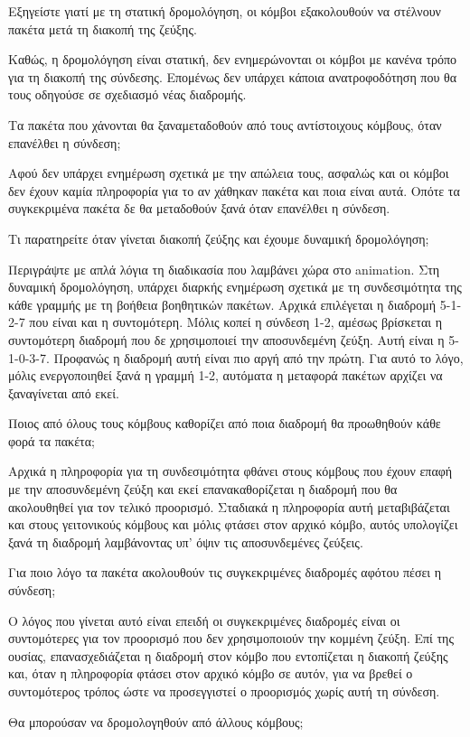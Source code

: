 \documentclass[a4paper,9pt]{article}
\begin{document}
\begin{itermize}
\item Εξηγείστε γιατί με τη στατική δρομολόγηση, οι κόμβοι εξακολουθούν να
στέλνουν πακέτα μετά τη διακοπή της ζεύξης.

Καθώς, η δρομολόγηση είναι στατική, δεν ενημερώνονται οι κόμβοι με κανένα
τρόπο για τη διακοπή της σύνδεσης. Επομένως δεν υπάρχει κάποια ανατροφοδότηση
που θα τους οδηγούσε σε σχεδιασμό νέας διαδρομής.

\item Τα πακέτα που χάνονται θα ξαναμεταδοθούν από τους αντίστοιχους κόμβους,
όταν επανέλθει η σύνδεση;

Αφού δεν υπάρχει ενημέρωση σχετικά με την απώλεια τους, ασφαλώς και οι κόμβοι
δεν έχουν καμία πληροφορία για το αν χάθηκαν πακέτα και ποια είναι αυτά. Οπότε
τα συγκεκριμένα πακέτα δε θα μεταδοθούν ξανά όταν επανέλθει η σύνδεση.

\item Τι παρατηρείτε όταν γίνεται διακοπή ζεύξης και έχουμε δυναμική
δρομολόγηση; 

Περιγράψτε με απλά λόγια τη διαδικασία που λαμβάνει χώρα στο animation.
Στη δυναμική δρομολόγηση, υπάρχει διαρκής ενημέρωση σχετικά με τη
συνδεσιμότητα της κάθε γραμμής με τη βοήθεια βοηθητικών πακέτων. Αρχικά
επιλέγεται η διαδρομή 5-1-2-7 που είναι και η συντομότερη. Μόλις κοπεί η
σύνδεση 1-2, αμέσως βρίσκεται η συντομότερη διαδρομή που δε χρησιμοποιεί την
αποσυνδεμένη ζεύξη. Αυτή είναι η 5-1-0-3-7. Προφανώς η διαδρομή αυτή είναι πιο
αργή από την πρώτη. Για αυτό το λόγο, μόλις ενεργοποιηθεί ξανά η γραμμή 1-2,
αυτόματα η μεταφορά πακέτων αρχίζει να ξαναγίνεται από εκεί.

\item Ποιος από όλους τους κόμβους καθορίζει από ποια διαδρομή θα προωθηθούν
κάθε φορά τα πακέτα;

Αρχικά η πληροφορία για τη συνδεσιμότητα φθάνει στους κόμβους που έχουν επαφή
με την αποσυνδεμένη ζεύξη και εκεί επανακαθορίζεται η διαδρομή που θα
ακολουθηθεί για τον τελικό προορισμό. Σταδιακά η πληροφορία αυτή μεταβιβάζεται
και στους γειτονικούς κόμβους και μόλις φτάσει στον αρχικό κόμβο, αυτός
υπολογίζει ξανά τη διαδρομή λαμβάνοντας υπ’ όψιν τις αποσυνδεμένες ζεύξεις.
\item Για ποιο λόγο τα πακέτα ακολουθούν τις συγκεκριμένες διαδρομές αφότου
πέσει η σύνδεση;

Ο λόγος που γίνεται αυτό είναι επειδή οι συγκεκριμένες διαδρομές είναι οι
συντομότερες για τον προορισμό που δεν χρησιμοποιούν την κομμένη ζεύξη. Επί
της ουσίας, επανασχεδιάζεται η διαδρομή στον κόμβο που εντοπίζεται η διακοπή
ζεύξης και, όταν η πληροφορία φτάσει στον αρχικό κόμβο σε αυτόν, για να βρεθεί
ο συντομότερος τρόπος ώστε να προσεγγιστεί ο προορισμός χωρίς αυτή τη σύνδεση.
\item Θα μπορούσαν να δρομολογηθούν από άλλους κόμβους;


\end{itermize}
\end{document}
